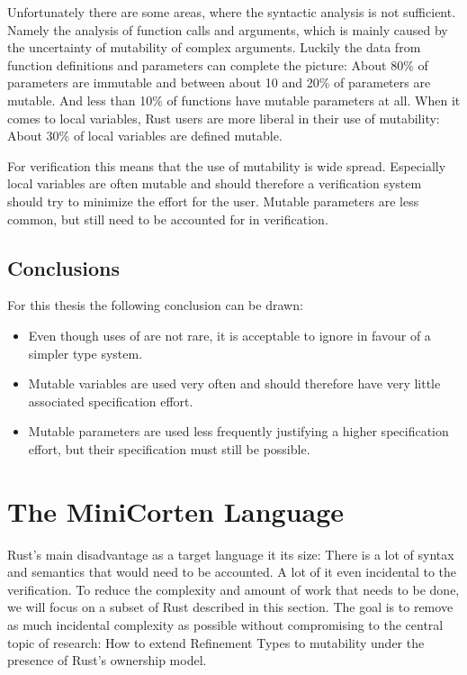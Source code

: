 \documentclass[twoside, english]{sdqthesis}
\theoremstyle{definition}
\begin{document}
Unfortunately there are some areas, where the syntactic analysis is not sufficient. Namely the analysis of function calls and arguments, which is mainly caused by the uncertainty of mutability of complex arguments.
Luckily the data from function definitions and parameters can complete the picture: About 80\% of parameters are immutable and between about 10 and 20\% of parameters are mutable. And less than 10\% of functions have mutable parameters at all.
When it comes to local variables, Rust users are more liberal in their use of mutability:
About 30\% of local variables are defined mutable.

For verification this means that the use of mutability is wide spread. Especially local variables are often mutable and should therefore a verification system should try to minimize the effort for the user. Mutable parameters are less common, but still need to be accounted for in verification.

\section{Conclusions}

For this thesis the following conclusion can be drawn:

\begin{itemize}
  \item Even though uses of  are not rare, it is acceptable to ignore in favour of a simpler type system.
  \item Mutable variables are used very often and should therefore have very little associated specification effort.
  \item Mutable parameters are used less frequently justifying a higher specification effort, but their specification must still be possible.
\end{itemize}
\fi

\chapter{The MiniCorten Language} \label{ch:language} 

Rust's main disadvantage as a target language it its size: There is a lot of syntax and semantics that would need to be accounted. A lot of it even incidental to the verification. 
To reduce the complexity and amount of work that needs to be done, we will focus on a subset of Rust described in this section.
The goal is to remove as much incidental complexity as possible without compromising to the central topic of research: How to extend Refinement Types to mutability under the presence of Rust's ownership model. 
\end{document}
